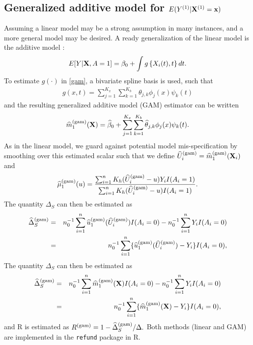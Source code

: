 \documentclass[useAMS,usenatbib,referee]{biom}
\begin{document}
\subsection{Generalized additive model for $E(Y^{(1)}| {\bf X}^{(1)} ={\bf x})$ \label{gamsection}}
Assuming a linear model may be a strong assumption in many instances, and a more general model may be desired. A ready generalization of the linear model is the additive model \citep{mclean2014}:
\begin{align}
    E[Y | \bX, A = 1] = \beta_0 + \int g\left\{X_i(t),  t\right\} dt. \label{gam}
\end{align}
To estimate $g(\cdot)$ in \eqref{gam}, a bivariate spline basis is used, such that
\begin{align*}
    g(x, t) = \sum_{j=1}^{K_x} \sum_{k=1}^{K_b} \theta_{j,k}\phi_j(x)\psi_k(t)
\end{align*}
and the resulting generalized additive model (GAM) estimator can be written
\[
\widehat{m}_1^{(\text{gam})}({\bf X}) = {\widehat\beta}_0 + \sum_{j=1}^{K_x} \sum_{k=1}^{K_b} {\widehat\theta}_{j,k}\phi_j(x)\psi_k(t). 
\]
As in the linear model, we guard against potential model mis-specification by smoothing over this estimated scalar such that we define $\widehat U^{(\text{gam})}_i = \widehat{m}_1^{(\text{gam})}({\bf X}_i)$ and $$\widehat \mu_1^{(\text{gam})} (u) = \frac{\sum_{i=1}^n K_h(\widehat U^{(\text{gam})}_i - u) Y_i I(A_i = 1)}{\sum_{i=1}^n K_h(\widehat U^{(\text{gam})}_i - u)  I(A_i = 1)}.$$
The quantity $\Delta_S$ can then be estimated as \begin{eqnarray*}
\widehat \Delta_S^{(\text{gam})} &=& n_0^{-1} \sum_{i=1}^n \widehat{u}_1^{(\text{gam})}(\widehat{U}^{(\text{gam})}_i) I(A_i = 0) - n_0^{-1}\sum_{i=1}^n Y_i I(A_i = 0) \\
&=& n_0^{-1} \sum_{i=1}^n \{ \widehat{u}_1^{(\text{gam})}(\widehat{U}^{(\text{gam})}_i) - Y_i\}I(A_i = 0),
\end{eqnarray*}
The quantity $\Delta_S$ can then be estimated as \begin{eqnarray*}
\widehat \Delta_S^{(\text{gam})} &=& n_0^{-1} \sum_{i=1}^n \widehat{m}_1^{(\text{gam})}({\bf X}) I(A_i = 0) - n_0^{-1}\sum_{i=1}^n Y_i I(A_i = 0) \\
&=& n_0^{-1} \sum_{i=1}^n \{ \widehat{m}_1^{(\text{gam})}({\bf X}) - Y_i\}I(A_i = 0),
\end{eqnarray*}
and R is estimated as $R^{(\text{gam})} = 1-\widehat \Delta_S^{(\text{gam})} / \Delta.$ Both methods (linear and GAM) are implemented in the \texttt{refund} package in R. 
\end{document}
